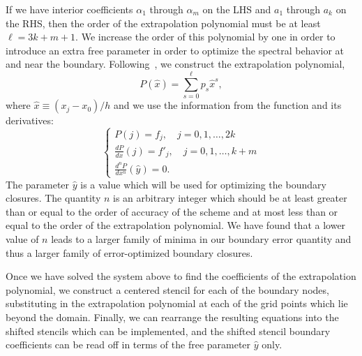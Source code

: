 If we have interior coefficients $\alpha_1$ through $\alpha_m$ on the LHS and $a_1$ through $a_k$ on the RHS, then the order of the extrapolation polynomial must be at least $\ell = 3k+m+1$.  
We increase the order of this polynomial by one in order to introduce an extra free parameter in order to optimize the spectral behavior at and near the boundary. Following~\cite{WuKim2024}, we construct the extrapolation polynomial, 
\begin{equation}
P(\hat{x}) = \sum_{s=0}^{\ell} p_s {\hat x}^s, 
\end{equation}
where ${\hat x} \equiv (x_j - x_0)/h$ and we use the information from the function and its derivatives: 
$$
\begin{cases}
    P(j) = f_j, \quad j = 0, 1, \dots, 2k\\
    \frac{dP}{dx}(j) = f'_j, \quad j = 0, 1, \dots, k + m\\
    \frac{d^n P}{dx^n}(\hat{y}) = 0.
\end{cases}
$$
The parameter $\hat{y}$ is a value which will be used for optimizing the boundary closures.  The quantity $n$ is an arbitrary integer which should be at least greater than or equal to the order of accuracy of the scheme and at most less than or equal to the order of the extrapolation polynomial. We have found that a lower value of $n$ leads to a larger family of minima in our boundary error quantity and thus a larger family of error-optimized boundary closures.

Once we have solved the system above to find the coefficients of the extrapolation polynomial, we construct a centered stencil for each of the boundary nodes, substituting in the extrapolation polynomial at each of the grid points which lie beyond the domain. Finally, we can rearrange the resulting equations into the shifted stencils which can be implemented, and the shifted stencil boundary coefficients can be read off in terms of the free parameter $\hat{y}$ only.

